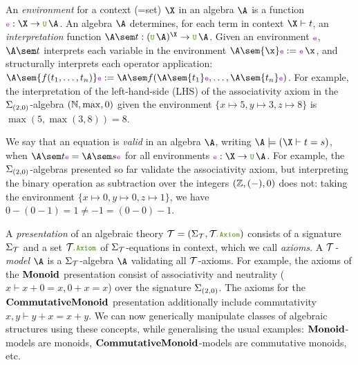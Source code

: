 An \emph{environment} for a context (=set) $\X$ in an algebra $\A$ is
a function $\env : \X \to \U\,\A$.
%
An algebra $\A$ determines, for
each term in context $\X \vdash t$, an \emph{interpretation} function
$\A\sem t : (\U\,\A)^{\X} \to \U\,\A$.
%
Given an environment $\env$, $\A\sem t$ interprets
each variable in the environment $\A\sem{\x}\env \definedby \env\,\x$,
and structurally interprets each operator
application:
$\A\sem{f(t_1, \ldots, t_n)}\env\definedby \A\sem f(\A\sem{t_1}\env, \ldots, \A\sem{t_n}\env)$.
For example, the interpretation of the left-hand-side (LHS) of the
associativity axiom in the $\Sigma_{(2,0)}$-algebra $(\mathbb{N},\max,0)$
given the environment $\{x \mapsto 5, y \mapsto 3, z \mapsto 8\}$ is
$\max(5, \max(3, 8)) = 8$.

We say that an equation is \emph{valid} in an algebra $\A$, writing
$\A \models (\X \vdash t = s)$, when $\A\sem t\env = \A\sem s\env$
for all environments $\env : \X \to \U\,\A$. %
For example, the $\Sigma_{(2,0)}$-algebras
presented so far validate the associativity axiom, but interpreting
the binary operation as subtraction over the integers $(\mathbb{Z},(-),0)$
does not: taking the
environment $\{x \mapsto 0, y \mapsto 0, z \mapsto 1\}$, we have
$0 - (0 - 1) = 1 \neq -1 = (0 - 0) - 1$.

A \emph{presentation} of an algebraic theory $\Pres = \pair{\Sig_{\Pres}}{\Pres\Axiom}$
consists of a signature $\Sigma_{\mathcal{T}}$ and a set $\Pres\Axiom$ of
$\Sigma_{\mathcal{T}}$-equations in context, which we call \emph{axioms}. A
\emph{$\mathcal{T}$-model} $\A$ is a $\Sigma_{\mathcal{T}}$-algebra $\A$ validating
all $\mathcal{T}$-axioms.  For example, the axioms of the $\mathbf{Monoid}$
presentation consist of associativity and neutrality ($x \vdash x
+ 0 = x, 0 + x = x$) over the signature $\Sigma_{(2,0)}$. The
axioms for the $\mathbf{CommutativeMonoid}$ presentation additionally include commutativity $x,y
\vdash y + x = x + y$. We can now generically manipulate classes of
algebraic structures using these concepts, while generalising the
usual examples: $\mathbf{Monoid}$-models are monoids, $\mathbf{CommutativeMonoid}$-models are
commutative monoids, etc.


